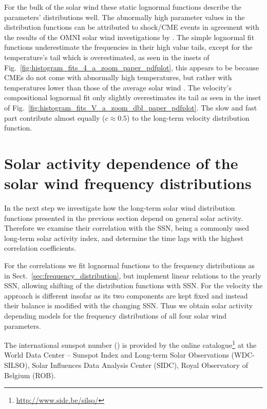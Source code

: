 \documentclass[]{aa}
\begin{document}
	For the bulk of the solar wind these static lognormal functions describe the parameters' distributions well. The abnormally high parameter values in the distribution functions can be attributed to shock/CME events in agreement with the results of the OMNI solar wind investigations by \citet{Richardson2012}. The simple lognormal fit functions underestimate the frequencies in their high value tails, except for the temperature’s tail which is overestimated, as seen in the insets of Fig.~\ref{fig:histogram_fits_4_a_zoom_paper_pdfplot}, this appears to be because CMEs do not come with abnormally high temperatures, but rather with temperatures lower than those of the average solar wind \citep{Forsyth2006}. The velocity's compositional lognormal fit only slightly overestimates its tail as seen in the inset of Fig.~\ref{fig:histogram_fits_V_a_zoom_dbl_paper_pdfplot}.
	The slow and fast part contribute almost equally ($c \approx 0.5$) to the long-term velocity distribution function.

	\section{Solar activity dependence of the solar wind frequency distributions}
	\label{sec:solar_activity_variations}
	In the next step we investigate how the long-term solar wind distribution functions presented in the previous section depend on general solar activity. Therefore we examine their correlation with the SSN, being a commonly used long-term solar activity index, and determine the time lags with the highest correlation coefficients.

	For the correlations we fit lognormal functions to the frequency distributions as in Sect.~\ref{sec:frequency_distribution}, but implement linear relations to the yearly SSN, allowing shifting of the distribution functions with SSN. For the velocity the approach is different insofar as its two components are kept fixed and instead their balance is modified with the changing SSN. Thus we obtain solar activity depending models for the frequency distributions of all four solar wind parameters.

	The international sunspot number (\citeyear{sidc}) is provided by the online catalogue\footnote{\url{http://www.sidc.be/silso/}} at the World Data Center -- Sunspot Index and Long-term Solar Observations (WDC-SILSO), Solar Influences Data Analysis Center (SIDC), Royal Observatory of Belgium (ROB).
\end{document}
